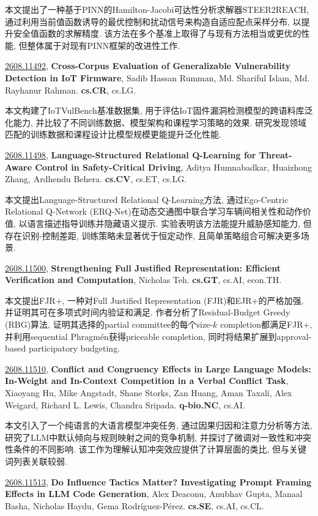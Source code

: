 \documentclass[9pt, a4paper]{article}
\theoremstyle{plain}
\theoremstyle{definition}
\theoremstyle{remark}
\newcommand{\arxivwithtarget}[3]{\hypertarget{#1}{}\href{https://arxiv.org/abs/#1}{#1}, \textbf{\textcolor{arxivblue}{#2}}, #3. }
\begin{document}
本文提出了一种基于PINN的Hamilton-Jacobi可达性分析求解器STEER2REACH, 通过利用当前值函数诱导的最优控制和扰动信号来构造自适应配点采样分布, 以提升安全值函数的求解精度. 该方法在多个基准上取得了与现有方法相当或更优的性能, 但整体属于对现有PINN框架的改进性工作.


\arxivwithtarget{2608.11492}{Cross-Corpus Evaluation of Generalizable Vulnerability Detection in IoT Firmware}{Sadib Hassan Rumman, Md. Shariful Islam, Md. Rayhanur Rahman}\textbf{cs.CR}, cs.LG.

本文构建了IoTVulBench基准数据集, 用于评估IoT固件漏洞检测模型的跨语料库泛化能力, 并比较了不同训练数据、模型架构和课程学习策略的效果. 研究发现领域匹配的训练数据和课程设计比模型规模更能提升泛化性能.


\arxivwithtarget{2608.11498}{Language-Structured Relational Q-Learning for Threat-Aware Control in Safety-Critical Driving}{Aditya Humnabadkar, Huaizhong Zhang, Ardhendu Behera}\textbf{cs.CV}, cs.ET, cs.LG.

本文提出Language-Structured Relational Q-Learning方法, 通过Ego-Centric Relational Q-Network (ERQ-Net)在动态交通图中联合学习车辆间相关性和动作价值, 以语言描述指导训练并隐藏语义提示. 实验表明该方法能提升威胁感知能力, 但存在识别-控制差距, 训练策略未显著优于恒定动作, 且简单策略组合可解决更多场景.


\arxivwithtarget{2608.11500}{Strengthening Full Justified Representation: Efficient Verification and Computation}{Nicholas Teh}\textbf{cs.GT}, cs.AI, econ.TH.

本文提出FJR+, 一种对Full Justified Representation (FJR)和EJR+的严格加强, 并证明其可在多项式时间内验证和满足. 作者分析了Residual-Budget Greedy (RBG)算法, 证明其选择的partial committee的每个size-$k$ completion都满足FJR+, 并利用sequential Phragmén获得priceable completion, 同时将结果扩展到approval-based participatory budgeting.


\arxivwithtarget{2608.11510}{Conflict and Congruency Effects in Large Language Models: In-Weight and In-Context Competition in a Verbal Conflict Task}{Xiaoyang Hu, Mike Angstadt, Shane Storks, Zan Huang, Aman Taxali, Alex Weigard, Richard L. Lewis, Chandra Sripada}\textbf{q-bio.NC}, cs.AI.

本文引入了一个纯语言的大语言模型冲突任务, 通过因果归因和注意力分析等方法, 研究了LLM中默认倾向与规则映射之间的竞争机制, 并探讨了微调对一致性和冲突性条件的不同影响. 该工作为理解认知冲突效应提供了计算层面的类比, 但与关键词列表关联较弱.


\arxivwithtarget{2608.11513}{Do Influence Tactics Matter? Investigating Prompt Framing Effects in LLM Code Generation}{Alex Deaconu, Anubhav Gupta, Manaal Basha, Nicholas Haydu, Gema Rodríguez-Pérez}\textbf{cs.SE}, cs.AI, cs.CL.
\end{document}
